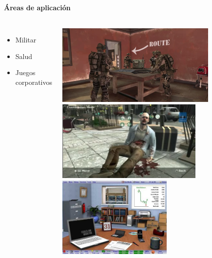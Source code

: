 \begin{frame}
\frametitle{\pagetitle}
\framesubtitle{Áreas de aplicación}

\pause{}
\begin{columns}
 \hspace{0.5cm}
\begin{itemize}[<+->]
	 \item Militar
     \item Salud
     \item Juegos corporativos
\end{itemize}

 \hspace{0.5cm}
\begin{overprint}
     \includegraphics[width=\textwidth, height=4cm]{../tics/images/army} 
     \includegraphics[width=\textwidth, height=4cm]{../tics/images/patient} 
     \includegraphics[width=\textwidth, height=4cm]{../tics/images/simventure} 
    
\end{overprint}

\end{columns}


\end{frame}
